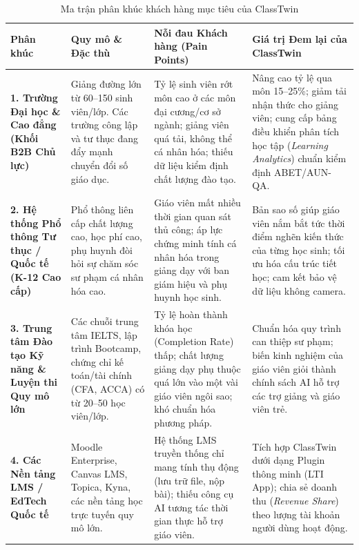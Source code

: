 \begin{table}[htbp]
  \centering\small
  \caption{Ma trận phân khúc khách hàng mục tiêu của ClassTwin}\label{tab:customer-segments}
  \begin{tabularx}{\textwidth}{p{2.8cm} p{3.8cm} p{4.2cm} X}
    \toprule
    \textbf{Phân khúc} & \textbf{Quy mô \& Đặc thù} & \textbf{Nỗi đau Khách hàng (Pain Points)} & \textbf{Giá trị Đem lại của ClassTwin} \\
    \midrule
    \textbf{1. Trường Đại học \& Cao đẳng (Khối B2B Chủ lực)} & Giảng đường lớn từ 60--150 sinh viên/lớp. Các trường công lập và tư thục đang đẩy mạnh chuyển đổi số giáo dục. & Tỷ lệ sinh viên rớt môn cao ở các môn đại cương/cơ sở ngành; giảng viên quá tải, không thể cá nhân hóa; thiếu dữ liệu kiểm định chất lượng đào tạo. & Nâng cao tỷ lệ qua môn 15--25\%; giảm tải nhận thức cho giảng viên; cung cấp bảng điều khiển phân tích học tập (\textit{Learning Analytics}) chuẩn kiểm định ABET/AUN-QA. \\
    \addlinespace
    \textbf{2. Hệ thống Phổ thông Tư thục / Quốc tế (K-12 Cao cấp)} & Phổ thông liên cấp chất lượng cao, học phí cao, phụ huynh đòi hỏi sự chăm sóc sư phạm cá nhân hóa cao. & Giáo viên mất nhiều thời gian quan sát thủ công; áp lực chứng minh tính cá nhân hóa trong giảng dạy với ban giám hiệu và phụ huynh học sinh. & Bản sao số giúp giáo viên nắm bắt tức thời điểm nghẽn kiến thức của từng học sinh; tối ưu hóa cấu trúc tiết học; cam kết bảo vệ dữ liệu không camera. \\
    \addlinespace
    \textbf{3. Trung tâm Đào tạo Kỹ năng \& Luyện thi Quy mô lớn} & Các chuỗi trung tâm IELTS, lập trình Bootcamp, chứng chỉ kế toán/tài chính (CFA, ACCA) có từ 20--50 học viên/lớp. & Tỷ lệ hoàn thành khóa học (Completion Rate) thấp; chất lượng giảng dạy phụ thuộc quá lớn vào một vài giáo viên ngôi sao; khó chuẩn hóa phương pháp. & Chuẩn hóa quy trình can thiệp sư phạm; biến kinh nghiệm của giáo viên giỏi thành chính sách AI hỗ trợ các trợ giảng và giáo viên trẻ. \\
    \addlinespace
    \textbf{4. Các Nền tảng LMS / EdTech Quốc tế} & Moodle Enterprise, Canvas LMS, Topica, Kyna, các nền tảng học trực tuyến quy mô lớn. & Hệ thống LMS truyền thống chỉ mang tính thụ động (lưu trữ file, nộp bài); thiếu công cụ AI tương tác thời gian thực hỗ trợ giáo viên. & Tích hợp ClassTwin dưới dạng Plugin thông minh (LTI App); chia sẻ doanh thu (\textit{Revenue Share}) theo lượng tài khoản người dùng hoạt động. \\
    \bottomrule
  \end{tabularx}
\end{table}

